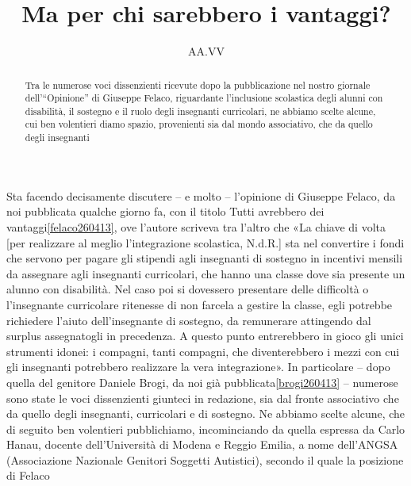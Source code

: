 \author{AA.VV}
\title{Ma per chi sarebbero i vantaggi?}
\label{cha:direttore290413}
\begin{abstract}
Tra le numerose voci dissenzienti ricevute dopo la pubblicazione nel nostro giornale dell’“Opinione” di Giuseppe Felaco, riguardante l’inclusione scolastica degli alunni con disabilità, il sostegno e il ruolo degli insegnanti curricolari, ne abbiamo scelte alcune, cui ben volentieri diamo spazio, provenienti sia dal mondo associativo, che da quello degli insegnanti
\end{abstract}
\maketitle
Sta facendo decisamente discutere – e molto – l'opinione di Giuseppe Felaco, da noi pubblicata qualche giorno fa, con il titolo Tutti avrebbero dei vantaggi\ref{felaco260413}, ove l'autore scriveva tra l'altro che «La chiave di volta [per realizzare al meglio l'integrazione scolastica, N.d.R.] sta nel convertire i fondi che servono per pagare gli stipendi agli insegnanti di sostegno in incentivi mensili da assegnare agli insegnanti curricolari, che hanno una classe dove sia presente un alunno con disabilità. Nel caso poi si dovessero presentare delle difficoltà o l'insegnante curricolare ritenesse di non farcela a gestire la classe, egli potrebbe richiedere l'aiuto dell'insegnante di sostegno, da remunerare attingendo dal surplus assegnatogli in precedenza. A questo punto entrerebbero in gioco gli unici strumenti idonei: i compagni, tanti compagni, che diventerebbero i mezzi con cui gli insegnanti potrebbero realizzare la vera integrazione».
In particolare – dopo quella del genitore Daniele Brogi, da noi già pubblicata\ref{brogi260413} – numerose sono state le voci dissenzienti giunteci in redazione, sia dal fronte associativo che da quello degli insegnanti, curricolari e di sostegno.
Ne abbiamo scelte alcune, che di seguito ben volentieri pubblichiamo, incominciando da quella espressa da Carlo Hanau, docente dell'Università di Modena e Reggio Emilia, a nome dell'ANGSA (Associazione Nazionale Genitori Soggetti Autistici), secondo il quale la posizione di Felaco  

